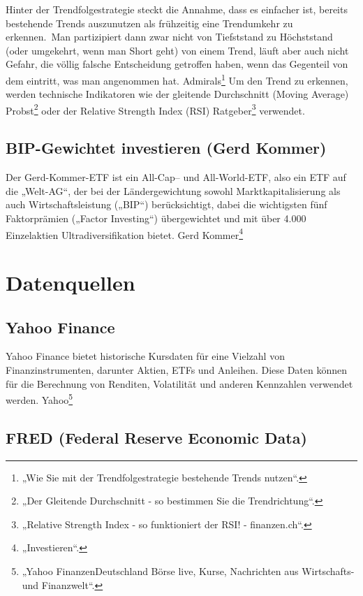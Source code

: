 \documentclass[
  ngerman,
  a4paper,
  DIV=11,
  oneside]{scrreprt}
\begin{document}
Hinter der Trendfolgestrategie steckt die Annahme, dass es einfacher
ist, bereits bestehende Trends auszunutzen als frühzeitig eine
Trendumkehr zu erkennen.~Man partizipiert dann zwar nicht von
Tiefststand zu Höchststand (oder umgekehrt, wenn man Short geht) von
einem Trend, läuft aber auch nicht Gefahr, die völlig falsche
Entscheidung getroffen haben, wenn das Gegenteil von dem eintritt, was
man angenommen hat. Admirals\footnote{{„Wie Sie mit der
  Trendfolgestrategie bestehende Trends nutzen``}.} Um den Trend zu
erkennen, werden technische Indikatoren wie der gleitende Durchschnitt
(Moving Average) Probst\footnote{{„Der Gleitende Durchschnitt - so
  bestimmen Sie die Trendrichtung``}.} oder der Relative Strength Index
(RSI) Ratgeber\footnote{{„Relative Strength Index - so funktioniert der
  RSI! - finanzen.ch``}.} verwendet.

\subsection{BIP-Gewichtet investieren (Gerd
Kommer)}\label{bip-gewichtet-investieren-gerd-kommer}

Der Gerd-Kommer-ETF ist ein All-Cap-- und All-World-ETF, also ein ETF
auf die „Welt-AG``, der bei der Ländergewichtung sowohl
Markt\-kapitalisierung als auch Wirtschafts\-leistung („BIP``)
berücksichtigt, dabei die wichtigsten fünf Faktor\-prämien („Factor
Investing``) übergewichtet und mit über 4.000 Einzelaktien
Ultradiversifikation bietet. Gerd Kommer\footnote{{„Investieren``}.}

\section{Datenquellen}\label{datenquellen}

\subsection{Yahoo Finance}\label{yahoo-finance-1}

Yahoo Finance bietet historische Kursdaten für eine Vielzahl von
Finanzinstrumenten, darunter Aktien, ETFs und Anleihen. Diese Daten
können für die Berechnung von Renditen, Volatilität und anderen
Kennzahlen verwendet werden. Yahoo\footnote{{„Yahoo FinanzenDeutschland
  \textbar{} Börse live, Kurse, Nachrichten aus Wirtschafts- und
  Finanzwelt``}.}

\subsection{FRED (Federal Reserve Economic
Data)}\label{fred-federal-reserve-economic-data-1}
\end{document}
